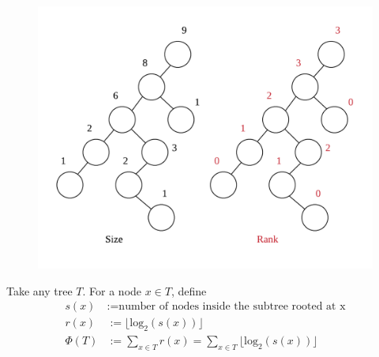 \documentclass[12pt]{article}
\begin{document}
\begin{figure}[h]
    \centering
    \includegraphics[scale=0.5]{size-rank.png}
\end{figure}
      
Take any tree $T$. For a node $x \in T$, define
\begin{align*}
    s(x) &:= \text{number of nodes inside the subtree rooted at x}\\
    r(x) &:= \lfloor \text{log}_2(s(x)) \rfloor\\
    \Phi(T) &:= \sum_{x \in T} r(x) = \sum_{x \in T} \lfloor \text{log}_2(s(x)) \rfloor
\end{align*}
\end{document}
